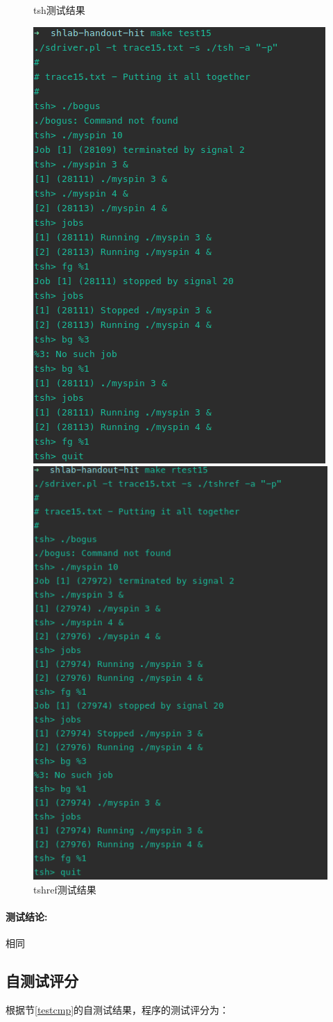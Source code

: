 \begin{figure}[H]
    \begin{minipage}[c]{0.5\linewidth}
        \centering
        \caption{tsh测试结果}
        \includegraphics[width=0.7\linewidth]{figures/test15.png}
    \end{minipage}
    \begin{minipage}[c]{0.5\linewidth}
        \centering
        \caption{tshref测试结果}
        \includegraphics[width=0.7\linewidth]{figures/rtest15.png}
    \end{minipage}
\end{figure}

\paragraph{测试结论:}相同

\subsection{自测试评分}

根据节\ref{testcmp}的自测试结果，程序的测试评分为：